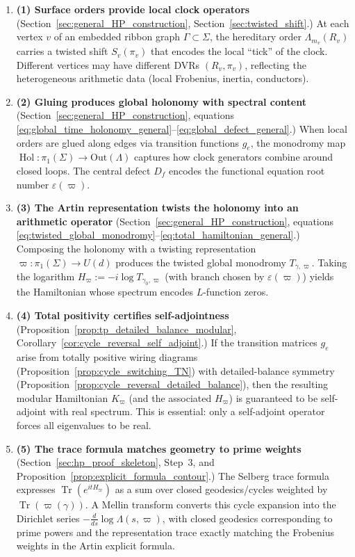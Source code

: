 \documentclass[11pt,oneside]{amsbook}
\numberwithin{equation}{section}
\theoremstyle{plain}
\theoremstyle{definition}
\theoremstyle{remark}
\DeclareMathOperator{\Hol}{\mathrm{Hol}}
\DeclareMathOperator{\Tr}{\mathrm{Tr}}
\begin{document}
\begin{enumerate}
\item 
\textbf{(1) Surface orders provide local clock operators}
(Section~\ref{sec:general_HP_construction}, Section~\ref{sec:twisted_shift}.)
At each vertex $v$ of an embedded ribbon graph $\Gamma\subset\Sigma$, the hereditary order $\Lambda_{m_v}(R_v)$ carries a twisted shift $S_v(\pi_v)$ that encodes the local ``tick'' of the clock. Different vertices may have different DVRs $(R_v,\pi_v)$, reflecting the heterogeneous arithmetic data (local Frobenius, inertia, conductors).

\item 
\textbf{(2) Gluing produces global holonomy with spectral content}
(Section~\ref{sec:general_HP_construction}, equations \eqref{eq:global_time_holonomy_general}--\eqref{eq:global_defect_general}.)
When local orders are glued along edges via transition functions $g_e$, the monodromy map $\Hol:\pi_1(\Sigma)\to\mathrm{Out}(\Lambda)$ captures how clock generators combine around closed loops. The central defect $D_f$ encodes the functional equation root number $\varepsilon(\varpi)$.

\item 
\textbf{(3) The Artin representation twists the holonomy into an arithmetic operator}
(Section~\ref{sec:general_HP_construction}, equations \eqref{eq:twisted_global_monodromy}--\eqref{eq:total_hamiltonian_general}.)
Composing the holonomy with a twisting representation $\varpi:\pi_1(\Sigma)\to U(d)$ produces the twisted global monodromy $T_{\gamma,\varpi}$. Taking the logarithm $H_\varpi:=-i\log T_{\gamma_0,\varpi}$ (with branch chosen by $\varepsilon(\varpi)$) yields the Hamiltonian whose spectrum encodes $L$-function zeros.

\item
\textbf{(4) Total positivity certifies self-adjointness}
(Proposition~\ref{prop:tp_detailed_balance_modular}, Corollary~\ref{cor:cycle_reversal_self_adjoint}.)
If the transition matrices $g_e$ arise from totally positive wiring diagrams (Proposition~\ref{prop:cycle_switching_TN}) with detailed-balance symmetry (Proposition~\ref{prop:cycle_reversal_detailed_balance}), then the resulting modular Hamiltonian $K_\varpi$ (and the associated $H_\varpi$) is guaranteed to be self-adjoint with real spectrum. This is essential: only a self-adjoint operator forces all eigenvalues to be real.

\item
\textbf{(5) The trace formula matches geometry to prime weights}
(Section~\ref{sec:hp_proof_skeleton}, Step~3, and Proposition~\ref{prop:explicit_formula_contour}.)
The Selberg trace formula expresses $\Tr(e^{itH_\varpi})$ as a sum over closed geodesics/cycles weighted by $\Tr(\varpi(\gamma))$. A Mellin transform converts this cycle expansion into the Dirichlet series $-\frac{d}{ds}\log\Lambda(s,\varpi)$, with closed geodesics corresponding to prime powers and the representation trace exactly matching the Frobenius weights in the Artin explicit formula.


\end{enumerate}
\end{document}

